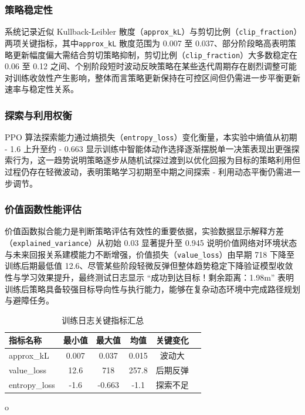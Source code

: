 \subsubsection{策略稳定性}

系统记录近似 Kullback-Leibler 散度（\texttt{approx\_kL}）与剪切比例（\texttt{clip\_fraction}）两项关键指标，其中\texttt{approx\_kL} 散度范围为 0.007 至 0.037、部分阶段略高表明策略更新幅度偏大需结合剪切策略抑制，剪切比例（\texttt{clip\_fraction}）大多数稳定在 0.06 至 0.12 之间、个别阶段短时波动反映策略在某些迭代周期存在剧烈调整可能对训练收敛性产生影响，整体而言策略更新保持在可控区间但仍需进一步平衡更新速率与稳定性关系。

\subsubsection{探索与利用权衡}

PPO 算法探索能力通过熵损失（\texttt{entropy\_loss}）变化衡量，本实验中熵值从初期 - 1.6 上升至约 - 0.663 显示训练中智能体动作选择逐渐摆脱单一决策表现出更强探索行为，这一趋势说明策略逐步从随机试探过渡到以优化回报为目标的策略利用但过程仍存在轻微波动，表明策略学习初期至中期之间探索 - 利用动态平衡仍需进一步调节。

\subsubsection{价值函数性能评估}

价值函数拟合能力是判断策略评估有效性的重要依据，实验数据显示解释方差（\texttt{explained\_variance}）从初始 0.03 显著提升至 0.945 说明价值网络对环境状态与未来回报关系建模能力不断增强，价值损失（\texttt{value\_loss}）由早期 718 下降至训练后期最低值 12.6、尽管某些阶段轻微反弹但整体趋势稳定下降验证模型收敛性与学习效果提升，最终测试日志显示 “成功到达目标！剩余距离：1.98m” 表明训练后策略具备较强目标导向性与执行能力，能够在复杂动态环境中完成路径规划与避障任务。

\begin{table}[H]
    \centering
    \caption{训练日志关键指标汇总}
    \label{tab:metrics}
    \begin{tabular}{lccccc}
        \toprule
        指标名称 & 最小值 & 最大值 & 均值 & 关键变化  \\
        \midrule
        approx\_kL & 0.007 & 0.037 & 0.015 & 波动大  \\
        value\_loss & 12.6 & 718 & 257.8 & 后期反弹  \\
        entropy\_loss & -1.6 & -0.663 & -1.1 & 探索不足  \\
        \bottomrule
    \end{tabular}
\end{table}o

